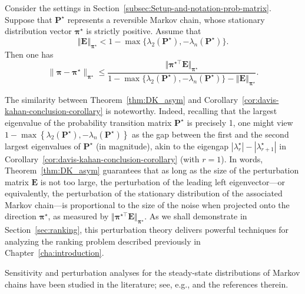 \begin{theorem}
\label{thm:DK_asym}
	Consider the settings in Section~\ref{subsec:Setup-and-notation-prob-matrix}. Suppose that $\bm{P}^{\star}$ represents a reversible Markov chain, whose stationary distribution vector $\bm{\pi}^{\star}$ is strictly positive.  Assume that
%
\begin{equation}
	\left\Vert \bm{E}\right\Vert _{\bm{\pi}^{\star}}
	< 1-\max\big\{ \lambda_{2}(\bm{P}^{\star}),-\lambda_{n}(\bm{P}^{\star})\big\} .
	\label{eq:spectral-gap-condition}
\end{equation}
%
Then one has
%
\[
	\|\bm{\pi}-\bm{\pi}^{\star}\|_{\bm{\pi}^{\star}}
	\leq
	\frac{\big\Vert \bm{\pi}^{\star\top}\bm{E}\big\Vert _{\bm{\pi}^{\star}}}{1-\max\big\{ \lambda_{2}(\bm{P}^{\star}),-\lambda_{n}(\bm{P}^{\star})\big\}
	-\left\Vert \bm{E}\right\Vert _{\bm{\pi}^{\star}}}.
\]
%
\end{theorem}
%
The similarity between Theorem~\ref{thm:DK_asym}
and Corollary~\ref{cor:davis-kahan-conclusion-corollary} is noteworthy. Indeed,
recalling that the largest eigenvalue of the probability transition matrix $\bm{P}^{\star}$ is precisely 1,
one might view $1-\max\left\{ \lambda_{2}(\bm{P}^{\star}),-\lambda_{n}(\bm{P}^{\star})\right\} $
as the gap between the first and the second largest eigenvalues of
$\bm{P}^{\star}$ (in magnitude),
akin to the eigengap $|\lambda_{r}^{\star}|-|\lambda_{r+1}^{\star}|$ in Corollary~\ref{cor:davis-kahan-conclusion-corollary} (with $r=1$).
In words, Theorem~\ref{thm:DK_asym} guarantees that as long as the size of the
perturbation matrix $\bm{E}$ is not too large, 
the  perturbation of the leading left eigenvector---or equivalently, the perturbation of the stationary distribution of the associated Markov chain---is proportional to the size of the noise when projected onto the direction $\bm{\pi}^{\star}$, as measured by $\Vert \bm{\pi}^{\star\top}\bm{E}\Vert _{\bm{\pi}^{\star}}$.
As we shall demonstrate in Section~\ref{sec:ranking}, this perturbation theory delivers powerful techniques for analyzing the ranking problem  described previously in Chapter~\ref{cha:introduction}.


\begin{remark}
	Sensitivity and perturbation analyses for the steady-state distributions of Markov chains have been studied in the literature; see, e.g., \citet{mitrophanov2005sensitivity,liu2012perturbation,jiang2017unified,rudolf2018perturbation} and the references therein. 
\end{remark}



